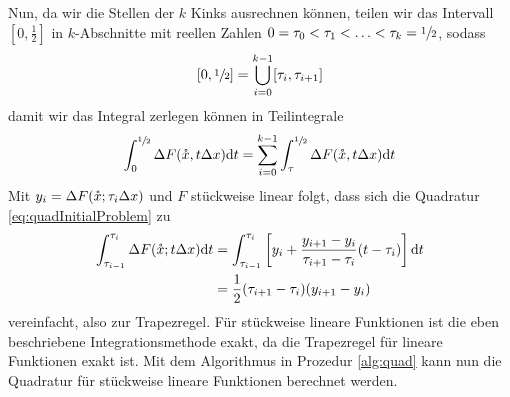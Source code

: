 Nun, da wir die Stellen der $k$ Kinks ausrechnen können, teilen wir das Intervall $[0,\frac{1}{2}]$ in $k$-Abschnitte mit reellen Zahlen $0=\tau_0<\tau_1<\ldots<\tau_k = \sfrac{1}{2}$,  sodass
\[
 [0,\sfrac{1}{2}] = \bigcup_{i=0}^{k-1} [\tau_i,\tau_{i+1}]
\]
damit wir das Integral zerlegen können in Teilintegrale
\[
 \int_0^{\sfrac{1}{2}} \Delta F(\mathring{x},t\Delta x) \text{d}t = \sum_{i=0}^{k-1} \int_\tau^{\sfrac{1}{2}} \Delta F(\mathring{x},t\Delta x) \text{d}t
\]
Mit $y_i = \Delta F(\mathring{x};\tau_i \Delta x)$ und $F$ stückweise linear folgt, dass sich die Quadratur \ref{eq:quadInitialProblem} zu
\begin{equation}
\begin{aligned}
 \int_{\tau_{i-1}}^{\tau_i} \Delta F(\mathring{x};t\Delta x) \text{d}t &= \int_{\tau_{i-1}}^{\tau_i}\left[ y_i+ \frac{y_{i+1}-y_i}{\tau_{i+1}-\tau_i}(t-\tau_i) \right] \text{d}t \\
 &=\frac{1}{2}(\tau_{i+1} -\tau_i)(y_{i+1}-y_i)
 \end{aligned}
\end{equation}
vereinfacht, also zur Trapezregel. Für stückweise lineare Funktionen ist die eben beschriebene Integrationsmethode exakt, da die Trapezregel für lineare Funktionen exakt ist.
Mit dem Algorithmus in Prozedur \ref{alg:quad} kann nun die Quadratur für stückweise lineare Funktionen berechnet werden. 


